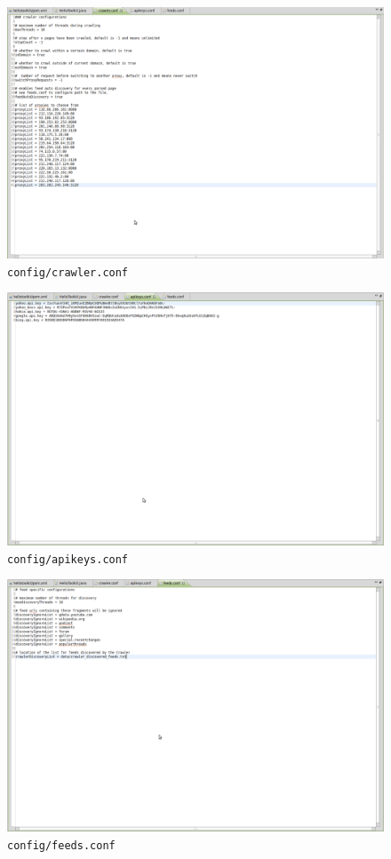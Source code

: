 \documentclass[a4paper,twoside]{book}      %
\begin{document}
\begin{figure}
\centering
\includegraphics[trim=0 250px 600px 0,clip=true,width=\textwidth]{img/ht11.png}
\caption{\texttt{config/crawler.conf}}
\label{fig:resource01}
\end{figure}
\begin{figure}
\centering
\includegraphics[trim=0 850px 600px 0,clip=true,width=\textwidth]{img/ht12.png}
\caption{\texttt{config/apikeys.conf}}
\label{fig:resource02}
\end{figure}
\begin{figure}
\centering
\includegraphics[trim=0 650px 600px 0,clip=true,width=\textwidth]{img/ht13.png}
\caption{\texttt{config/feeds.conf}}
\label{fig:resource03}
\end{figure}
\end{document}
